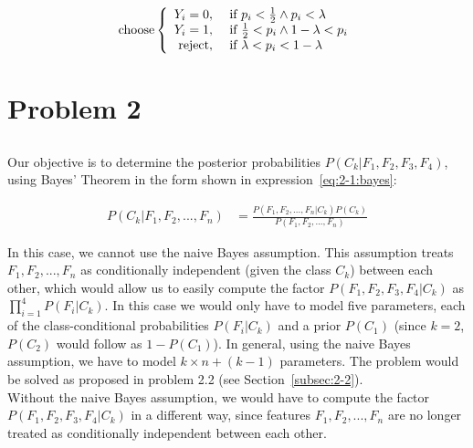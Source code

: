 \documentclass[paper=a4, fontsize=11pt]{scrartcl} %
\numberwithin{equation}{section} %
\numberwithin{figure}{section} %
\numberwithin{table}{section} %
\begin{document}
\begin{equation}
    \text{choose} \left\{ 
        \begin{array}{rl}
            Y_i = 0, &\mbox{ \text{if $p_i < \frac{1}{2} \wedge p_i < \lambda$}} \\
            Y_i = 1, &\mbox{ \text{if $\frac{1}{2} < p_i \wedge 1 - \lambda < p_i$}} \\
            \text{reject}, &\mbox{ \text{if $ \lambda < p_i < 1 - \lambda$}}
        \end{array} \right.
    \label{eq:1-final}
\end{equation}

\section{Problem 2}

\subsection{}
\label{subsec:2-1}

Our objective is to determine the posterior probabilities $P(C_k|F_1,F_2,F_3,F_4)$, 
using Bayes' Theorem in the form shown in expression~\ref{eq:2-1:bayes}:

\begin{equation}
\begin{split}
    P(C_k|F_1,F_2, ...,F_n)  &= \frac{P(F_1,F_2, ...,F_n|C_k)P(C_k)}{P(F_1,F_2, ...,F_n)}
    \label{eq:2-1:bayes}
\end{split}
\end{equation}

In this case, we cannot use the naive Bayes assumption. This assumption 
treats $F_1, F_2, ..., F_n$ as conditionally independent (given the class $C_k$) 
between each other, which would allow us to easily compute the factor 
$P(F_1,F_2,F_3,F_4|C_k)$ as $\prod_{i=1}^{4} P(F_i|C_k)$. In this case we would 
only have to model five parameters, each of the class-conditional probabilities 
$P(F_i|C_k)$ and a prior $P(C_1)$ (since $k = 2$, $P(C_2)$ would follow as 
$1 - P(C_1)$). In general, using the naive Bayes assumption, we have to model 
$k \times n + (k - 1)$ parameters. The problem would be solved as proposed in 
problem 2.2 (see Section~\ref{subsec:2-2}).\\

Without the naive Bayes assumption, we would have to compute the factor 
$P(F_1,F_2,F_3,F_4|C_k)$ in a different way, since features 
$F_1, F_2, ..., F_n$ are no longer treated as conditionally independent between 
each other.\\ 
\end{document}
